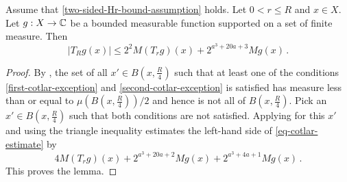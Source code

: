\begin{lemma}
\label{Cotlar-estimate}
Assume that \eqref{two-sided-Hr-bound-assumption} holds.
Let $0<r\le R$ and  $x\in X$. Let $g:X\to{\mathbb{C}}$ be a bounded measurable function supported on a set of finite measure. Then
\begin{equation}\label{eq-cotlar-estimate}
|T_Rg(x)| \le 2^{2}M(T_rg)(x)+ 2^{a^3+20a+3} Mg(x)
\, .
\end{equation}
\end{lemma}


\begin{proof}
By , the set of all $x'\in B(x,\frac {R} 4)$
such that at least one of the conditions
\eqref{first-cotlar-exception} and
\eqref{second-cotlar-exception} is satisfied has measure less than or equal to $\mu(B(x,\frac{R}{4}))/2$ and hence is not all of $B(x,\frac {R} 4)$.
Pick an $x'\in B(x,\frac {R} 4)$ such that both conditions are not satisfied.
Applying  for this $x'$ and using the triangle inequality
estimates the left-hand side of \eqref{eq-cotlar-estimate}
by
\begin{equation}
    4 M(T_rg)(x) + 2^{a^3 + 20a + 2} Mg(x) + 2^{a^3 + 4a + 1} Mg(x)\, .
\end{equation}
This proves the lemma.
\end{proof}

